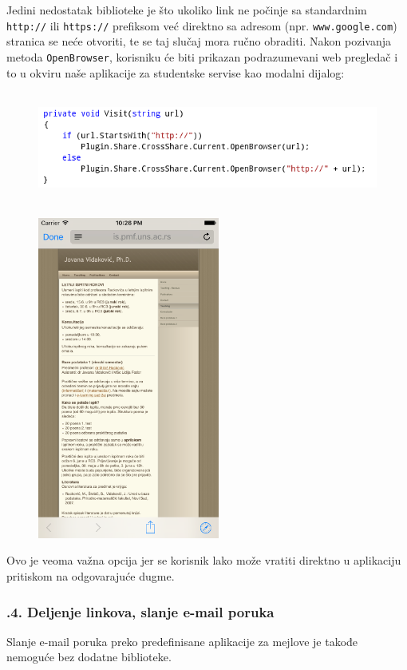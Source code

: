 \documentclass[a4paper]{article}
\begin{document}
Jedini nedostatak biblioteke je što ukoliko link ne počinje sa
standardnim \texttt{\textcolor[rgb]{0.0,0.4,0.8}{http://}} ili
\texttt{\textcolor[rgb]{0.0,0.4,0.8}{https://}} prefiksom već direktno
sa adresom (npr. \texttt{\textcolor[rgb]{0.0,0.4,0.8}{www.google.com}})
stranica se neće otvoriti, te se taj slučaj mora ručno obraditi. Nakon
pozivanja metoda \texttt{\textcolor[rgb]{0.0,0.4,0.8}{OpenBrowser}},
korisniku će biti prikazan podrazumevani web pregledač i to u okviru
naše aplikacije za studentske servise kao modalni dijalog:

\begin{figure}
\centering
\includegraphics[width=153.46mm,height=36.78mm]{msc-img72.png}
\end{figure}


\begin{figure}
\centering
\includegraphics[width=59.67mm,height=106.13mm]{msc-img73.png}
\end{figure}
Ovo je veoma važna opcija jer se korisnik lako može vratiti direktno u
aplikaciju pritiskom na odgovarajuće dugme.

\subsubsection[7.10.4. Deljenje linkova, slanje e{}-mail
poruka]{.4. Deljenje linkova, slanje e-mail poruka}
\hypertarget{RefHeadingToc883882405265}{}Slanje e-mail poruka preko
predefinisane aplikacije za mejlove je takođe nemoguće bez dodatne
biblioteke.
\end{document}

